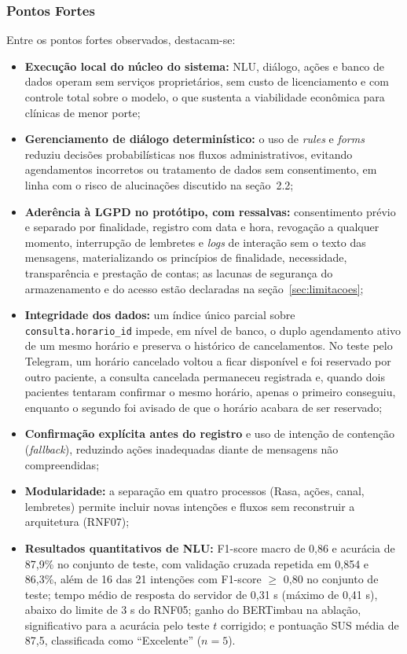 \documentclass[12pt,a4paper]{extarticle}
\begin{document}
\subsubsection{Pontos Fortes}
\label{sec:pontos_fortes}

Entre os pontos fortes observados, destacam-se:

\begin{itemize}
    \item \textbf{Execução local do núcleo do sistema:} NLU, diálogo, ações e banco de dados operam sem serviços proprietários, sem custo de licenciamento e com controle total sobre o modelo, o que sustenta a viabilidade econômica para clínicas de menor porte;
    \item \textbf{Gerenciamento de diálogo determinístico:} o uso de \textit{rules} e \textit{forms} reduziu decisões probabilísticas nos fluxos administrativos, evitando agendamentos incorretos ou tratamento de dados sem consentimento, em linha com o risco de alucinações discutido na seção~2.2;
    \item \textbf{Aderência à LGPD no protótipo, com ressalvas:} consentimento prévio e separado por finalidade, registro com data e hora, revogação a qualquer momento, interrupção de lembretes e \textit{logs} de interação sem o texto das mensagens, materializando os princípios de finalidade, necessidade, transparência e prestação de contas; as lacunas de segurança do armazenamento e do acesso estão declaradas na seção~\ref{sec:limitacoes};
    \item \textbf{Integridade dos dados:} um índice único parcial sobre \texttt{consulta.horario\_\allowbreak{}id} impede, em nível de banco, o duplo agendamento ativo de um mesmo horário e preserva o histórico de cancelamentos. No teste pelo Telegram, um horário cancelado voltou a ficar disponível e foi reservado por outro paciente, a consulta cancelada permaneceu registrada e, quando dois pacientes tentaram confirmar o mesmo horário, apenas o primeiro conseguiu, enquanto o segundo foi avisado de que o horário acabara de ser reservado;
    \item \textbf{Confirmação explícita antes do registro} e uso de intenção de contenção (\textit{fallback}), reduzindo ações inadequadas diante de mensagens não compreendidas;
    \item \textbf{Modularidade:} a separação em quatro processos (Rasa, ações, canal, lembretes) permite incluir novas intenções e fluxos sem reconstruir a arquitetura (RNF07);
    \item \textbf{Resultados quantitativos de NLU:} F1-score macro de 0,86 e acurácia de 87,9\% no conjunto de teste, com validação cruzada repetida em 0,854 e 86,3\%, além de 16 das 21 intenções com F1-score $\geq$ 0,80 no conjunto de teste; tempo médio de resposta do servidor de 0,31 s (máximo de 0,41 s), abaixo do limite de 3 s do RNF05; ganho do BERTimbau na ablação, significativo para a acurácia pelo teste $t$ corrigido; e pontuação SUS média de 87,5, classificada como ``Excelente'' ($n = 5$).
\end{itemize}
\end{document}
